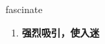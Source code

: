 
\begin{frame}
{\huge fascinate}
\begin{center}
\begin{enumerate}\Large
  \item \textbf{强烈吸引，使入迷}
\end{enumerate}
\end{center}
\end{frame}

